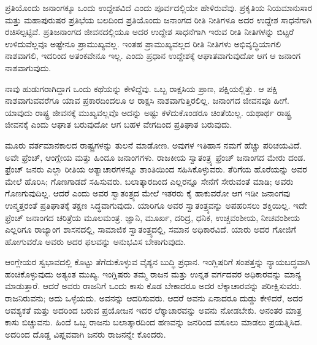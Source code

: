 \vskip 6pt

ಪ್ರತಿಯೊಂದು ಜನಾಂಗಕ್ಕೂ ಒಂದು ಉದ್ದೇಶವಿದೆ ಎಂದು ಪೂರ್ವದಲ್ಲಿಯೇ ಹೇಳಿರು\-ವೆವು. ಪ್ರಕೃತಿಯ ನಿಯಮಾನುಸಾರ ಮತ್ತು ಮಹಾಪುರುಷರ ಪ್ರತಿಭೆಯ ಬಲದಿಂದ ಪ್ರತಿಯೊಂದು ಜನಾಂಗದ ರೀತಿ ನೀತಿಗಳೂ ಅದರ ಉದ್ದೇಶ ಸಾಧನೆಗಾಗಿ ರಚಿಸಲ್ಪಟ್ಟಿವೆ. ಪ್ರತಿಜನಾಂಗದ ಜೀವನದಲ್ಲಿಯೂ ಅದರ ಉದ್ದೇಶ ಸಾಧನೆಗಾಗಿ ಇರುವ ರೀತಿ ನೀತಿಗಳನ್ನು ಬಿಟ್ಟರೆ ಉಳಿದುವೆಲ್ಲವೂ ಅಷ್ಟೇನೂ ಪ್ರಾಮುಖ್ಯವಲ್ಲ. ಇಂತಹ ಪ್ರಾಮುಖ್ಯವಲ್ಲದ ರೀತಿ ನೀತಿಗಳು ಅಭಿವೃದ್ಧಿಯಾಗಲಿ ನಾಶವಾಗಲಿ, ಇದರಿಂದ ಅತಂಕವೇನೂ ಇಲ್ಲ. ಎಂದು ಪ್ರಧಾನ ಉದ್ದೇಶಕ್ಕೆ ಆಘಾತವಾಗುವುದೋ ಆಗ ಆ ಜನಾಂಗ ನಾಶವಾಗುವುದು.

\vskip 6pt

ನಾವು ಹುಡುಗರಾಗಿದ್ದಾಗ ಒಂದು ಕಥೆಯನ್ನು ಕೇಳಿದ್ದೆವು. ಒಬ್ಬ ರಾಕ್ಷಸಿಯ ಪ್ರಾಣ, ಪಕ್ಷಿಯಲ್ಲಿತ್ತು. ಆ ಪಕ್ಷಿ ನಾಶವಾಗುವವರೆಗೂ ಯಾವ ಪ್ರಕಾರದಿಂದಲೂ ಆ ರಾಕ್ಷಸಿ ನಾಶವಾಗುತ್ತಿರಲಿಲ್ಲ. ಜನಾಂಗದ ಜೀವನವೂ ಹೀಗೆ. ಯಾವುದು ರಾಷ್ಟ್ರ ಜೀವನಕ್ಕೆ ಮುಖ್ಯವಲ್ಲವೊ ಅದನ್ನು ಅಷ್ಟು ಕಳೆದುಕೊಂಡರೂ ಚಿಂತೆಯಿಲ್ಲ. ಯಥಾರ್ಥ ರಾಷ್ಟ್ರ ಜೀವನಕ್ಕೆ ಎಂದು ಆಘಾತ ಬರುವುದೋ ಆಗ ಬಹಳ ವೇಗದಿಂದ ಪ್ರತಿಘಾತ ಬರುವುದು.

\vskip 6pt

ಮೂರು ವರ್ತಮಾನಕಾಲದ ರಾಷ್ಟ್ರಗಳನ್ನು ತುಲನೆ ಮಾಡೋಣ. ಅವುಗಳ ಇತಿಹಾಸ ನಮಗೆ ಹೆಚ್ಚು ಪರಿಚಯವಿದೆ. ಅವೇ ಫ್ರೆಂಚ್​, ಆಂಗ್ಲೇಯ ಮತ್ತು ಹಿಂದೂ ಜನಾಂಗಗಳು. ರಾಜಕೀಯ ಸ್ವಾತಂತ್ರ್ಯ ಫ್ರೆಂಚ್​ ಜನಾಂಗದ ಮೇರು ದಂಡ. ಫ್ರೆಂಚ್​ ಜನರು ಎಲ್ಲಾ ರೀತಿಯ ಅತ್ಯಾಚಾರಗಳನ್ನೂ ಶಾಂತಿಯಿಂದ ಸಹಿಸಿಕೊಳ್ಳುವರು. ತೆರಿಗೆಯ ಹೊರೆಯನ್ನು ಅವರ ಮೇಲೆ ಹೊರಿಸಿ; ಗೊಣಗಾಡದೆ ಸಹಿಸುವರು. ಬಲಾತ್ಕಾರದಿಂದ ಎಲ್ಲರನ್ನೂ ಸೇನೆಗೆ ಸೇರುವಂತೆ ಮಾಡಿ; ಅವರು ಗೊಣಗುವುದಿಲ್ಲ. ಆದರೆ ಎಂದು ಅವರ ಸ್ವಾತಂತ್ರ್ಯದ ಮೇಲೆ ಇತರರು ಕೈ ಹಾಕುವರೋ ಆಗ ಇಡೀ ಜನಾಂಗವು ಉನ್ಮತ್ತರಂತೆ ಪ್ರತಿಘಾತಕ್ಕೆ ತಕ್ಷಣ ಸಿದ್ಧವಾಗುವುದು. ಯಾರಿಗೂ ಅವರ ಸ್ವಾತಂತ್ರ್ಯವನ್ನು ಅಪಹರಿಸಲು ಶಕ್ತಿಯಿಲ್ಲ. ಇದೇ ಫ್ರೆಂಚ್​ ಜನಾಂಗದ ಚರಿತ್ರೆಯ ಮೂಲಮಂತ್ರ. ಜ್ಞಾನಿ, ಮೂರ್ಖ, ದರಿದ್ರ, ಧನಿಕ, ಉಚ್ಚವಂಶೀಯ, ನೀಚವಂಶೀಯ ಎಲ್ಲರಿಗೂ ರಾಜ್ಯಾಂಗ ಶಾಸನದಲ್ಲಿ, ಸಾಮಾಜಿಕ ಸ್ವಾತಂತ್ರ್ಯದಲ್ಲಿ, ಸಮಾನ ಅಧಿಕಾರವಿದೆ. ಯಾರು ಅದರ ಗೋಜಿಗೆ ಹೋಗುವರೊ ಅವರು ಅದರ ಫಲವನ್ನು ಅನುಭವಿಸ ಬೇಕಾಗುವುದು.

\vskip 6pt

ಆಂಗ್ಲೇಯರ ಸ್ವಭಾವದಲ್ಲಿ ಕೊಟ್ಟು ತೆಗೆದುಕೊಳ್ಳುವ ವೈಶ್ಯನ ಬುದ್ಧಿ ಪ್ರಧಾನ. ಇಂಗ್ಲಿಷರಿಗೆ ಸಂಪತ್ತನ್ನು ನ್ಯಾಯಬದ್ಧವಾಗಿ ಹಂಚಿಕೊಳ್ಳುವುದು ಅತ್ಯಂತ ಮುಖ್ಯ. ಇಂಗ್ಲಿಷರು ತಮ್ಮ ರಾಜನ ಮತ್ತು ಉನ್ನತ ವರ್ಗದವರ ಅಧಿಕಾರವನ್ನು ಮಾನ್ಯ ಮಾಡುತ್ತಾರೆ. ಆದರೆ ಅವರು ರಾಜನಿಗೆ ಒಂದು ಕಾಸು ಕೊಡ ಬೇಕಾದರೂ ಅದರ ಲೆಕ್ಕಾಚಾರವನ್ನು ಪರೀಕ್ಷಿಸುವರು. ರಾಜನಿರುವನು; ಅದು ಒಳ್ಳೆಯದು. ಅವನನ್ನು ಆದರಿಸುವರು. ಆದರೆ ಅವನು ಏನಾದರೂ ದುಡ್ಡು ಕೇಳಿದರೆ, ಅದರ ಆವಶ್ಯಕತೆ ಮತ್ತು ಅದರಿಂದ ಬರುವ ಪ್ರಯೋಜನ ಇದರ ಲೆಕ್ಕಾಚಾರವನ್ನು ಅವನು ನೋಡಬೇಕು. ಅನಂತರ ಮಾತ್ರ ಕಾಸು ಬಿಚ್ಚುವನು. ಹಿಂದೆ ಒಬ್ಬ ರಾಜನು ಬಲಾತ್ಕಾರದಿಂದ ಹಣವನ್ನು ಜನರಿಂದ ವಸೂಲು ಮಾಡಲು ಪ್ರಯತ್ನಿಸಿದ. ಅದರಿಂದ ದೊಡ್ಡ ವಿಪ್ಲವವಾಗಿ ಜನರು ರಾಜನನ್ನೇ ಕೊಂದರು.

\vskip 6pt

